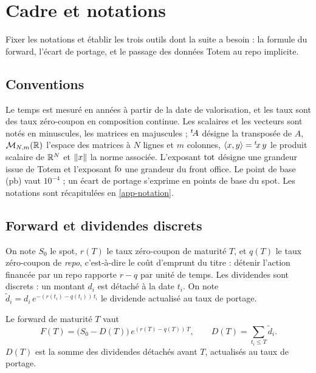 \section{Cadre et notations}\label{sec-cadre}

\begin{objectif}
Fixer les notations et établir les trois outils dont la suite a besoin : la formule du forward, l'écart de portage,
et le passage des données Totem au repo implicite.
\end{objectif}

\subsection{Conventions}
Le temps est mesuré en années à partir de la date de valorisation, et les taux sont des taux zéro-coupon en
composition continue. Les scalaires et les vecteurs sont notés en minuscules, les matrices en majuscules ;
${}^{t}\!A$ désigne la transposée de $A$, $\mathcal{M}_{N,m}(\mathbb{R})$ l'espace des matrices à $N$ lignes et $m$ colonnes,
$\langle x, y\rangle={}^{t}\!x\,y$ le produit scalaire de $\mathbb{R}^N$ et $\lVert x\rVert$ la norme associée. L'exposant $\mathrm{tot}$ désigne une
grandeur issue de Totem et l'exposant $\mathrm{fo}$ une grandeur du front office. Le point de base (pb) vaut $10^{-4}$ ; un
écart de portage s'exprime en points de base du spot. Les notations sont récapitulées en \cref{app-notation}.

\subsection{Forward et dividendes discrets}
On note $S_0$ le spot, $r(T)$ le taux zéro-coupon de maturité $T$, et $q(T)$ le taux zéro-coupon de \emph{repo},
c'est-à-dire le coût d'emprunt du titre : détenir l'action financée par un repo rapporte $r-q$ par unité de temps.
Les dividendes sont discrets : un montant $d_i$ est détaché à la date $t_i$. On note
$\tilde d_i=d_i\,e^{-(r(t_i)-q(t_i))\,t_i}$ le dividende actualisé au taux de portage.

\begin{definition}[Forward]\label{def-forward}
Le forward de maturité $T$ vaut
\begin{equation}\label{eq-forward}
F(T)=\bigl(S_0-D(T)\bigr)\,e^{(r(T)-q(T))\,T}, \qquad D(T)=\sum_{t_i\le T}\tilde d_i .
\end{equation}
$D(T)$ est la somme des dividendes détachés avant $T$, actualisés au taux de portage.
\end{definition}

